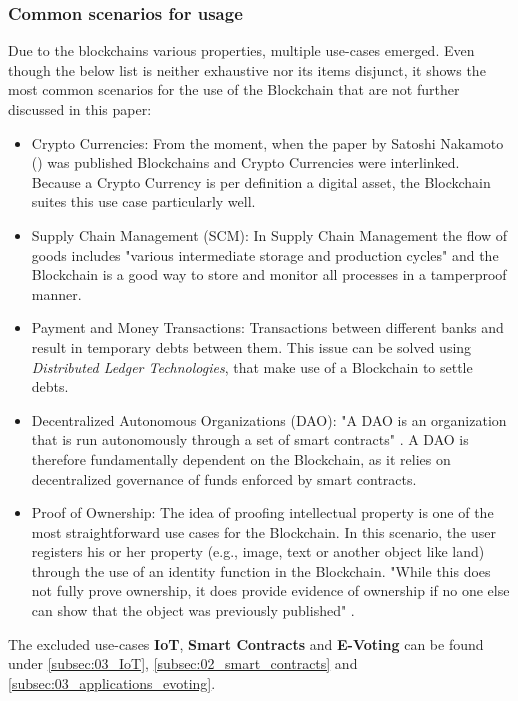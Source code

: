 \subsubsection{Common scenarios for usage}
Due to the blockchains various properties, multiple use-cases emerged. Even though the below list is neither exhaustive nor its items disjunct, it shows the most common scenarios for the use of the Blockchain\cite{Wust2017} that are not further discussed in this paper:
\begin{itemize}
  \item Crypto Currencies: From the moment, when the paper by Satoshi Nakamoto (\cite{Nakamoto2009}) was published Blockchains and Crypto Currencies were interlinked. Because a Crypto Currency is per definition a digital asset, the Blockchain suites this use case particularly well.
  \item Supply Chain Management (SCM): In Supply Chain Management the flow of goods includes "various intermediate storage and production cycles" \cite{Wust2017} and the Blockchain is a good way to store and monitor all processes in a tamperproof manner.
  \item Payment and Money Transactions: Transactions between different banks and result in temporary debts between them. This issue can be solved using \textit{Distributed Ledger Technologies}, that make use of a Blockchain to settle debts. 
  \item Decentralized Autonomous Organizations (DAO): "A DAO is an organization that is run autonomously through a set of smart contracts" \cite{Wust2017}. A DAO is therefore fundamentally dependent on the Blockchain, as it relies on decentralized governance of funds enforced by smart contracts.
  \item Proof of Ownership: The idea of proofing intellectual property is one of the most straightforward use cases for the Blockchain. In this scenario, the user registers his or her property (e.g., image, text or another object like land) through the use of an identity function in the Blockchain. "While this does not fully prove ownership, it does provide evidence of ownership if no one else can show that the object was previously published" \cite{Wust2017}.   
\end{itemize}
The excluded use-cases \textbf{IoT}, \textbf{Smart Contracts} and \textbf{E-Voting} can be found under \ref{subsec:03_IoT}, \ref{subsec:02_smart_contracts} and \ref{subsec:03_applications_evoting}.


